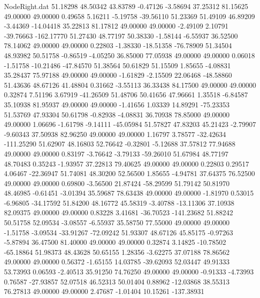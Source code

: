 \begin{filecontents}{NodeRight.dat}
  51.18298   48.50342   43.83789    -0.47126   -3.58694   37.25312   81.15625   49.00000   49.00000    0.49658    5.16211   -5.19758  -39.56110
  51.23369   51.49109   46.89209    -3.44369  -14.04418   35.22813   81.17812   49.00000   49.00000   -2.49109    2.10791  -39.76663 -162.17770
  51.27430   48.77197   50.38330    -1.58144   -6.55937   36.52500   78.14062   49.00000   49.00000    0.22803   -1.38330  -18.51358  -76.78909
  51.34504   48.93982   50.51758    -0.86519   -4.05250   36.85000   77.05938   49.00000   49.00000    0.06018   -1.51758  -10.21486  -47.84570
  51.38564   50.61829   51.15509     1.85655   -4.08831   35.28437   75.97188   49.00000   49.00000   -1.61829   -2.15509   22.06468  -48.58860
  51.43636   48.67126   41.48804     0.31662   -3.55113   36.33438   84.17500   49.00000   49.00000    0.32874    7.51196    3.67919  -41.26509
  51.48706   50.41656   47.96661     1.35518   -6.84587   35.10938   81.95937   49.00000   49.00000   -1.41656    1.03339   14.89291  -75.23353
  51.53769   47.93304   50.61798    -0.82938   -4.08831   36.70938   78.85000   49.00000   49.00000    1.06696   -1.61798   -9.14111  -45.05984
  51.57827   47.83203   45.21423    -2.79907   -9.60343   37.50938   82.96250   49.00000   49.00000    1.16797    3.78577  -32.42634 -111.25290
  51.62907   48.16803   52.76642    -0.32801   -5.12688   37.57812   77.94688   49.00000   49.00000    0.83197   -3.76642   -3.79133  -59.26010
  51.67984   48.77197   48.70483     0.35243   -1.93957   37.22813   79.40625   49.00000   49.00000    0.22803    0.29517    4.06467  -22.36947
  51.74081   48.30200   52.56500     1.85655   -4.94781   37.64375   76.52500   49.00000   49.00000    0.69800   -3.56500   21.87424  -58.29599
  51.79142   50.81970   48.46985    -0.61451   -3.01394   35.59687   78.63438   49.00000   49.00000   -1.81970    0.53015   -6.96805  -34.17592
  51.84200   48.16772   45.58319    -3.40788  -13.11306   37.10938   82.09375   49.00000   49.00000    0.83228    3.41681  -36.70523 -141.23682
  51.88242   50.51758   52.09534    -3.08557   -6.55937   35.58750   77.55000   49.00000   49.00000   -1.51758   -3.09534  -33.91267  -72.09242
  51.93307   48.67126   45.85175    -0.97263   -5.87894   36.47500   81.40000   49.00000   49.00000    0.32874    3.14825  -10.78502  -65.18864
  51.98373   48.43628   50.65155     1.28356   -3.62275   37.07188   78.86562   49.00000   49.00000    0.56372   -1.65155   14.03785  -39.62093
  52.03447   49.91333   53.73993     0.06593   -2.40513   35.91250   74.76250   49.00000   49.00000   -0.91333   -4.73993    0.76587  -27.93857
  52.07518   46.52313   50.01404     0.88962  -12.03868   38.55313   76.27813   49.00000   49.00000    2.47687   -1.01404   10.15261 -137.38931

\end{filecontents}
